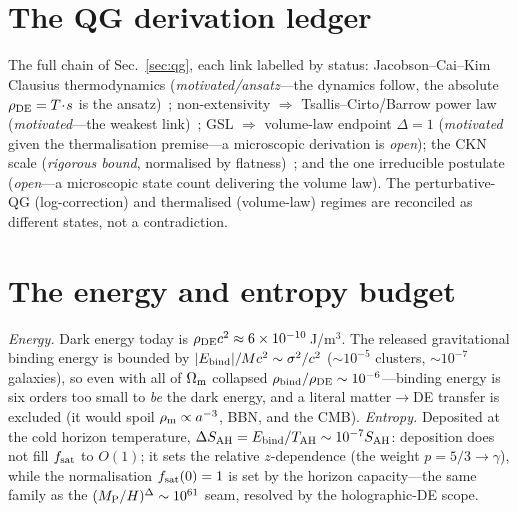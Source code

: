 \section{The QG derivation ledger}\label{app:ledger}
The full chain of Sec.~\ref{sec:qg}, each link labelled by status:
Jacobson--Cai--Kim Clausius thermodynamics (\emph{motivated/ansatz}---the dynamics follow, the absolute
$\rho_{\mathrm{DE}}=T\!\cdot\!s$ is the ansatz)~\cite{Jacobson:1995ab,Cai:2005ra}; non-extensivity $\Rightarrow$
Tsallis--Cirto/Barrow power law (\emph{motivated}---the weakest link)~\cite{Tsallis:2012js,Barrow:2020kug};
GSL $\Rightarrow$ volume-law endpoint $\Delta=1$ (\emph{motivated} given the thermalisation premise---a
microscopic derivation is \emph{open}); the CKN scale (\emph{rigorous bound}, normalised by
flatness)~\cite{Cohen:1998zx}; and the one irreducible postulate (\emph{open}---a microscopic state count
delivering the volume law). The perturbative-QG (log-correction) and thermalised (volume-law) regimes are
reconciled as different states, not a contradiction.

\section{The energy and entropy budget}\label{app:budget}
\emph{Energy.} Dark energy today is $\rho_{\mathrm{DE}} c^2\approx6\times10^{-10}$\,J/m$^3$. The released
gravitational binding energy is bounded by $|E_{\rm bind}|/Mc^2\sim\sigma^2/c^2$ ($\sim10^{-5}$
clusters, $\sim10^{-7}$ galaxies), so even with all of $\Omega_{\mathrm m}$ collapsed
$\rho_{\rm bind}/\rho_{\mathrm{DE}}\sim10^{-6}$---binding energy is six orders too small to \emph{be} the dark
energy, and a literal matter$\to$DE transfer is excluded (it would spoil $\rho_{\rm m}\propto a^{-3}$,
BBN, and the CMB). \emph{Entropy.} Deposited at the cold horizon temperature, $\Delta S_{\rm AH}=E_{\rm
bind}/T_{\mathrm{AH}}\sim10^{-7}S_{\rm AH}$: deposition does not fill $f_{\mathrm{sat}}$ to $O(1)$; it sets the relative
$z$-dependence (the weight $p=5/3\to\gamma$), while the normalisation $f_{\mathrm{sat}}(0)=1$ is set by the horizon
capacity---the same family as the $(M_{\mathrm P}/H)^\Delta\sim10^{61}$ seam, resolved by the holographic-DE
scope.

